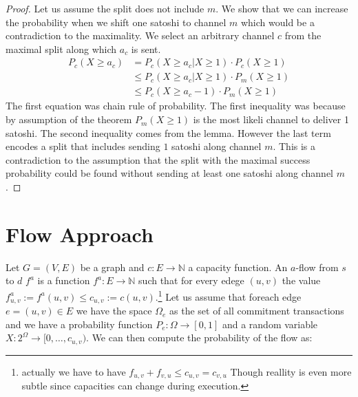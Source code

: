 \documentclass[10pt,twocolumn]{article}
\begin{document}
\begin{proof}
  Let us assume the split does not include $m$.
  We show that we can increase the probability when we shift one satoshi to channel $m$ which would be a contradiction to the maximality.
  We select an arbitrary channel $c$ from the maximal split along which $a_c$ is sent.
  \begin{equation*}
    \begin{aligned}
      P_c(X\geq a_c) & = P_c(X \geq a_c | X \geq 1)\cdot P_c(X\geq 1) \\
      & \leq P_c(X \geq a_c | X \geq 1)\cdot P_m(X\geq 1) \\
      & \leq P_c(X \geq a_c - 1 ) \cdot P_m(X\geq 1)
    \end{aligned}  
  \end{equation*}
  The first equation was chain rule of probability.
  The first inequality was because by assumption of the theorem $P_m(X\geq 1)$ is the most likeli channel to deliver 1 satoshi.
  The second inequality comes from the lemma.
  However the last term encodes a split that includes sending $1$ satoshi along channel $m$.
  This is a contradiction to the assumption that the split with the maximal success probability could be found without sending at least one satoshi along channel $m$.
\end{proof}
  

\section{Flow Approach}
Let $G = (V,E)$ be a graph and $c: E \longrightarrow \mathbb{N}$ a capacity function.
An $a$-flow from $s$ to $d$ $f^a$ is a function $f^a: E \longrightarrow \mathbb{N}$ such that for every edege $(u,v)$ the value $f^a_{u,v}:=f^a(u,v) \leq c_{u,v} := c(u,v)$.\footnote{actually we have to have $f_{u,v}+f_{v,u} \leq c_{u,v} = c_{v,u}$ Though reallity is even more subtle since capacities can change during execution.}
Let us assume that foreach edge $e = (u,v)\in E$ we have the space $\Omega_e$ as the set of all commitment transactions and we have a probability function $P_e: \Omega \longrightarrow [0,1]$ and a random variable $X: 2^\Omega \longrightarrow [0,\dots,c_{u,v})$.
We can then compute the probability of the flow as:
\end{document}
